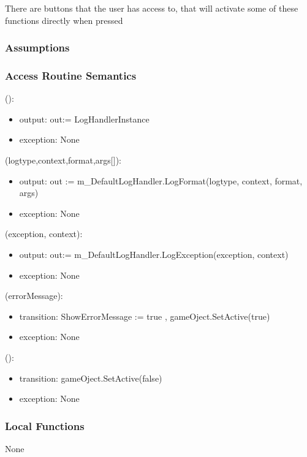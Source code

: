 \documentclass[12pt, titlepage]{article}
\begin{document}
There are buttons that the user has access to, that will activate some of these functions directly when pressed

\subsubsection{Assumptions}

\subsubsection{Access Routine Semantics}

():
\begin{itemize}
\item output: out:= LogHandlerInstance
\item exception: None
\end{itemize}

(logtype,context,format,args[]):
\begin{itemize}
\item output: out := m\_DefaultLogHandler.LogFormat(logtype, context, format, args)
\item exception: None
\end{itemize}

(exception, context):
\begin{itemize}
\item output: out:= m\_DefaultLogHandler.LogException(exception, context)
\item exception: None
\end{itemize}

(errorMessage):
\begin{itemize}
\item transition: ShowErrorMessage := true , gameOject.SetActive(true)
\item exception: None
\end{itemize}

():
\begin{itemize}
\item transition: gameOject.SetActive(false)
\item exception: None
\end{itemize}


\subsubsection{Local Functions}
None
\end{document}

